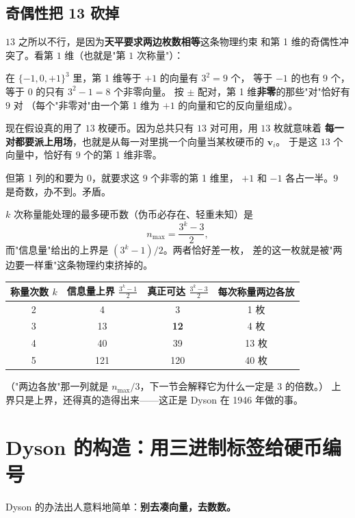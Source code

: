 \documentclass[UTF8,11pt,fontset=macnew]{ctexart}
\newcommand{\vv}{\mathbf{v}}
\begin{document}
\subsection{奇偶性把 13 砍掉}

$13$ 之所以不行，是因为\textbf{天平要求两边枚数相等}这条物理约束
和第 1 维的奇偶性冲突了。看第 $1$ 维（也就是"第 $1$ 次称量"）：

在 $\{-1,0,+1\}^3$ 里，第 1 维等于 $+1$ 的向量有 $3^2=9$ 个，
等于 $-1$ 的也有 $9$ 个，等于 $0$ 的只有 $3^2-1=8$ 个非零向量。
按 $\pm$ 配对，第 1 维\textbf{非零}的那些"对"恰好有 $9$ 对
（每个"非零对"由一个第 1 维为 $+1$ 的向量和它的反向量组成）。

现在假设真的用了 $13$ 枚硬币。因为总共只有 $13$ 对可用，用 $13$ 枚就意味着
\textbf{每一对都要派上用场}，也就是从每一对里挑一个向量当某枚硬币的 $\vv_i$。
于是这 $13$ 个向量中，恰好有 $9$ 个的第 1 维非零。

但第 1 列的和要为 $0$，就要求这 $9$ 个非零的第 1 维里，
$+1$ 和 $-1$ 各占一半。$9$ 是奇数，办不到。矛盾。

\begin{keybox}[一般结论]
$k$ 次称量能处理的最多硬币数（伪币必存在、轻重未知）是
\[
n_{\max}=\frac{3^k-3}{2},
\]
而"信息量"给出的上界是 $(3^k-1)/2$。两者恰好差一枚，
差的这一枚就是被"两边要一样重"这条物理约束挤掉的。
\end{keybox}

\begin{center}
\begin{tabular}{c c c c}
\toprule
称量次数 $k$ & 信息量上界 $\frac{3^k-1}{2}$ & 真正可达 $\frac{3^k-3}{2}$ & 每次称量两边各放 \\
\midrule
2 & 4 & 3   & 1 枚 \\
3 & 13 & \textbf{12} & 4 枚 \\
4 & 40 & 39  & 13 枚 \\
5 & 121 & 120 & 40 枚 \\
\bottomrule
\end{tabular}
\end{center}

（"两边各放"那一列就是 $n_{\max}/3$，下一节会解释它为什么一定是 $3$ 的倍数。）
上界只是上界，还得真的造得出来——这正是 Dyson 在 1946 年做的事。

\section{Dyson 的构造：用三进制标签给硬币编号}
\label{sec:construct}

Dyson 的办法出人意料地简单：\textbf{别去凑向量，去数数。}
\end{document}
